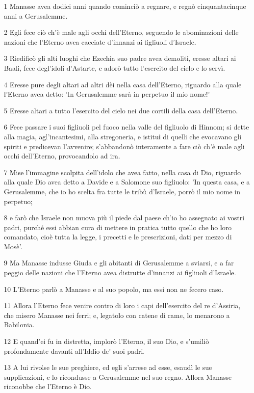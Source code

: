 \par 1 Manasse avea dodici anni quando cominciò a regnare, e regnò cinquantacinque anni a Gerusalemme.
\par 2 Egli fece ciò ch'è male agli occhi dell'Eterno, seguendo le abominazioni delle nazioni che l'Eterno avea cacciate d'innanzi ai figliuoli d'Israele.
\par 3 Riedificò gli alti luoghi che Ezechia suo padre avea demoliti, eresse altari ai Baali, fece degl'idoli d'Astarte, e adorò tutto l'esercito del cielo e lo servì.
\par 4 Eresse pure degli altari ad altri dèi nella casa dell'Eterno, riguardo alla quale l'Eterno avea detto: 'In Gerusalemme sarà in perpetuo il mio nome!'
\par 5 Eresse altari a tutto l'esercito del cielo nei due cortili della casa dell'Eterno.
\par 6 Fece passare i suoi figliuoli pel fuoco nella valle del figliuolo di Hinnom; si dette alla magia, agl'incantesimi, alla stregoneria, e istituì di quelli che evocavano gli spiriti e predicevan l'avvenire; s'abbandonò interamente a fare ciò ch'è male agli occhi dell'Eterno, provocandolo ad ira.
\par 7 Mise l'immagine scolpita dell'idolo che avea fatto, nella casa di Dio, riguardo alla quale Dio avea detto a Davide e a Salomone suo figliuolo: 'In questa casa, e a Gerusalemme, che io ho scelta fra tutte le tribù d'Israele, porrò il mio nome in perpetuo;
\par 8 e farò che Israele non muova più il piede dal paese ch'io ho assegnato ai vostri padri, purché essi abbian cura di mettere in pratica tutto quello che ho loro comandato, cioè tutta la legge, i precetti e le prescrizioni, dati per mezzo di Mosè'.
\par 9 Ma Manasse indusse Giuda e gli abitanti di Gerusalemme a sviarsi, e a far peggio delle nazioni che l'Eterno avea distrutte d'innanzi ai figliuoli d'Israele.
\par 10 L'Eterno parlò a Manasse e al suo popolo, ma essi non ne fecero caso.
\par 11 Allora l'Eterno fece venire contro di loro i capi dell'esercito del re d'Assiria, che misero Manasse nei ferri; e, legatolo con catene di rame, lo menarono a Babilonia.
\par 12 E quand'ei fu in distretta, implorò l'Eterno, il suo Dio, e s'umiliò profondamente davanti all'Iddio de' suoi padri.
\par 13 A lui rivolse le sue preghiere, ed egli s'arrese ad esse, esaudì le sue supplicazioni, e lo ricondusse a Gerusalemme nel suo regno. Allora Manasse riconobbe che l'Eterno è Dio.
